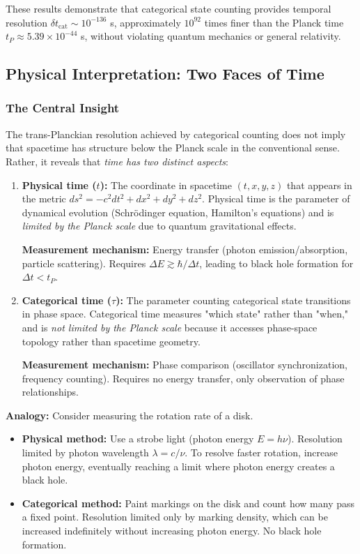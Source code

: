 \documentclass[twocolumn,10pt]{article}
\theoremstyle{remark}
\begin{document}
These results demonstrate that categorical state counting provides temporal resolution $\delta t_{\text{cat}} \sim 10^{-136}$ s, approximately $10^{92}$ times finer than the Planck time $t_P \approx 5.39 \times 10^{-44}$ s, without violating quantum mechanics or general relativity.

\subsection{Physical Interpretation: Two Faces of Time}

\subsubsection{The Central Insight}

The trans-Planckian resolution achieved by categorical counting does not imply that spacetime has structure below the Planck scale in the conventional sense. Rather, it reveals that \textit{time has two distinct aspects}:

\begin{enumerate}
    \item \textbf{Physical time ($t$):} The coordinate in spacetime $(t, x, y, z)$ that appears in the metric $ds^2 = -c^2 dt^2 + dx^2 + dy^2 + dz^2$. Physical time is the parameter of dynamical evolution (Schrödinger equation, Hamilton's equations) and is \textit{limited by the Planck scale} due to quantum gravitational effects.

    \textbf{Measurement mechanism:} Energy transfer (photon emission/absorption, particle scattering). Requires $\Delta E \gtrsim \hbar/\Delta t$, leading to black hole formation for $\Delta t < t_P$.

    \item \textbf{Categorical time ($\tau$):} The parameter counting categorical state transitions in phase space. Categorical time measures "which state" rather than "when," and is \textit{not limited by the Planck scale} because it accesses phase-space topology rather than spacetime geometry.

    \textbf{Measurement mechanism:} Phase comparison (oscillator synchronization, frequency counting). Requires no energy transfer, only observation of phase relationships.
\end{enumerate}

\textbf{Analogy:} Consider measuring the rotation rate of a disk.
\begin{itemize}
    \item \textbf{Physical method:} Use a strobe light (photon energy $E = h\nu$). Resolution limited by photon wavelength $\lambda = c/\nu$. To resolve faster rotation, increase photon energy, eventually reaching a limit where photon energy creates a black hole.

    \item \textbf{Categorical method:} Paint markings on the disk and count how many pass a fixed point. Resolution limited only by marking density, which can be increased indefinitely without increasing photon energy. No black hole formation.
\end{itemize}
\end{document}
